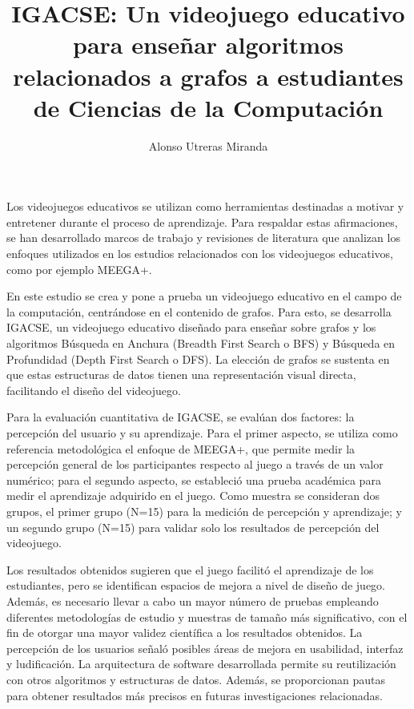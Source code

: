 \documentclass{umemoria}
\author{Alonso Utreras Miranda}
\title{IGACSE: Un videojuego educativo para enseñar algoritmos relacionados a grafos a estudiantes de Ciencias de la Computación}
\begin{document}
\frontmatter
\maketitle

\begin{resumen}

Los videojuegos educativos se utilizan como herramientas destinadas a motivar y entretener durante el proceso de aprendizaje. Para respaldar estas afirmaciones, se han desarrollado marcos de trabajo y revisiones de literatura que analizan los enfoques utilizados en los estudios relacionados con los videojuegos educativos, como por ejemplo MEEGA+.

En este estudio se crea y pone a prueba un videojuego educativo en el campo de la computación, centrándose en el contenido de grafos. Para esto, se desarrolla IGACSE, un videojuego educativo diseñado para enseñar sobre grafos y los algoritmos Búsqueda en Anchura (Breadth First Search o BFS) y Búsqueda en Profundidad (Depth First Search o DFS). La elección de grafos se sustenta en que estas estructuras de datos tienen una representación visual directa, facilitando el diseño del videojuego.

Para la evaluación cuantitativa de IGACSE, se evalúan dos factores: la percepción del usuario y su aprendizaje. Para el primer aspecto, se utiliza como referencia metodológica el enfoque de MEEGA+, que permite medir la percepción general de los participantes respecto al juego a través de un valor numérico; para el segundo aspecto, se estableció una prueba académica para medir el aprendizaje adquirido en el juego. Como muestra se consideran dos grupos, el primer grupo (N=15) para la medición de percepción y aprendizaje; y un segundo grupo (N=15) para validar solo los resultados de percepción del videojuego.

Los resultados obtenidos sugieren que el juego facilitó el aprendizaje de los estudiantes, pero se identifican espacios de mejora a nivel de diseño de juego. Además, es necesario llevar a cabo un mayor número de pruebas empleando diferentes metodologías de estudio y muestras de tamaño más significativo, con el fin de otorgar una mayor validez científica a los resultados obtenidos. La percepción de los usuarios señaló posibles áreas de mejora en usabilidad, interfaz y ludificación. La arquitectura de software desarrollada permite su reutilización con otros algoritmos y estructuras de datos. Además, se proporcionan pautas para obtener resultados más precisos en futuras investigaciones relacionadas.


\end{resumen}
\end{document}
